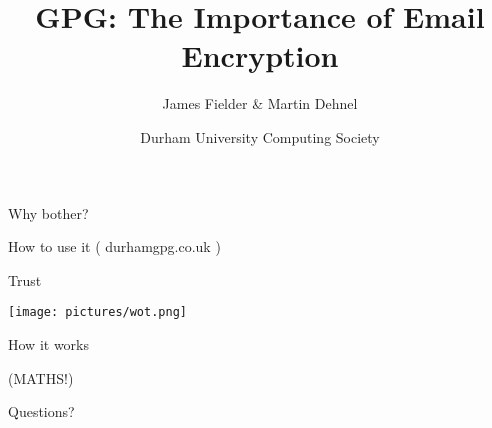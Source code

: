\documentclass[xcolor=dvipsnames,usepdftitle=false]{beamer}
\title[GPG Key Signing Party]{GPG: The Importance of Email Encryption}
\author{James Fielder \& Martin Dehnel}
\institute[Durham]{}
\date[14 May 2012]{Durham University Computing Society}
\institute[Durham]{\texttt{[image: pictures/logo\_purple.eps]}}
\newcommand{\MyLogo}{%
	\begin{textblock}{14}(119.0,1.0) %
		\texttt{[image: pictures/logo\_only.eps]}
	\end{textblock}
}
\begin{document}
\frame[plain]{\titlepage}



\begin{frame}{}
\begin{center}
\Huge{Why bother?}
\end{center}

\end{frame}

\begin{frame}{}
\begin{center}
\Huge{How to use it}\vfill
( durhamgpg.co.uk )
\end{center}

\end{frame}

\begin{frame}{}
\begin{center}
\Huge{Trust}
\end{center}

\end{frame}

\begin{frame}{}
\begin{center}
                \texttt{[image: pictures/wot.png]}
\end{center}
\end{frame}

\begin{frame}{}
\begin{center}
{\Huge How it works}\vfill

(MATHS!)
\end{center}



\end{frame}

\begin{frame}{}
\begin{center}
\Huge{Questions?}
\end{center}

\end{frame}
\end{document}

